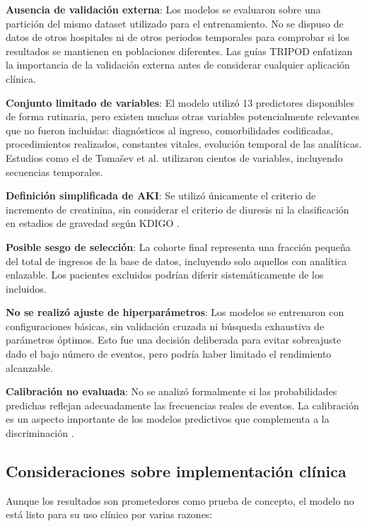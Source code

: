 \documentclass[12pt, a4paper, oneside]{report}
\begin{document}
\textbf{Ausencia de validación externa}: Los modelos se evaluaron sobre una partición del mismo dataset utilizado para el entrenamiento. No se dispuso de datos de otros hospitales ni de otros periodos temporales para comprobar si los resultados se mantienen en poblaciones diferentes. Las guías TRIPOD \cite{collins2015tripod} enfatizan la importancia de la validación externa antes de considerar cualquier aplicación clínica.

\textbf{Conjunto limitado de variables}: El modelo utilizó 13 predictores disponibles de forma rutinaria, pero existen muchas otras variables potencialmente relevantes que no fueron incluidas: diagnósticos al ingreso, comorbilidades codificadas, procedimientos realizados, constantes vitales, evolución temporal de las analíticas. Estudios como el de Tomašev et al. \cite{tomasev2019nature} utilizaron cientos de variables, incluyendo secuencias temporales.

\textbf{Definición simplificada de AKI}: Se utilizó únicamente el criterio de incremento de creatinina, sin considerar el criterio de diuresis ni la clasificación en estadios de gravedad según KDIGO \cite{kdigo2012aki}.

\textbf{Posible sesgo de selección}: La cohorte final representa una fracción pequeña del total de ingresos de la base de datos, incluyendo solo aquellos con analítica enlazable. Los pacientes excluidos podrían diferir sistemáticamente de los incluidos.

\textbf{No se realizó ajuste de hiperparámetros}: Los modelos se entrenaron con configuraciones básicas, sin validación cruzada ni búsqueda exhaustiva de parámetros óptimos. Esto fue una decisión deliberada para evitar sobreajuste dado el bajo número de eventos, pero podría haber limitado el rendimiento alcanzable.

\textbf{Calibración no evaluada}: No se analizó formalmente si las probabilidades predichas reflejan adecuadamente las frecuencias reales de eventos. La calibración es un aspecto importante de los modelos predictivos que complementa a la discriminación \cite{steyerberg2014clinical}.

\subsection{Consideraciones sobre implementación clínica}

Aunque los resultados son prometedores como prueba de concepto, el modelo no está listo para su uso clínico por varias razones:
\end{document}
